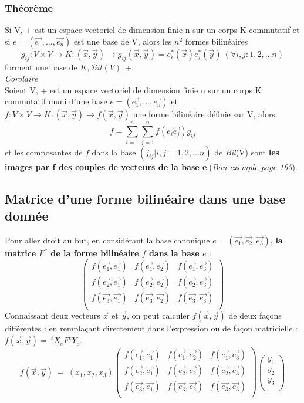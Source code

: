 \documentclass[12pt, a4paper, openany]{article}
\begin{document}
\subsubsection*{Théorème}
Si V, + est un espace vectoriel de dimension finie n sur un corps K commutatif et si $e = (\vec{e_1}, ..., \vec{e_n})$ est une base de V, alors les $n^2$ formes bilinéaires 
$$g_{ij} : V \times V \rightarrow K : (\vec{x}, \vec{y}) \rightarrow g_{ij}(\vec{x}, \vec{y}) = e_i^*(\vec{x})e_j^*(\vec{y})\ (\forall i, j : 1,2,...n)$$
forment une base de $K,\mathcal{B}il(V),+$.\\

\emph{Corolaire}\\
Soient V, + est un espace vectoriel de dimension finie n sur un corps K commutatif muni d'une base $e = (\vec{e_1}, ..., \vec{e_n})$ et $f : V \times V \rightarrow K : (\vec{x}, \vec{y}) \rightarrow f(\vec{x}, \vec{y})$ une forme bilinéaire définie sur V, alors
$$f = \sum_{i=1}^n\sum_{j=1}^n f(\vec{e_i}\vec{e_j})g_{ij}$$
et les composantes de $f$ dans la base $(j_{ij} | i,j= 1,2,...n)$ de \textit{Bil}(V) sont \textbf{les images par f des couples de vecteurs de la base e}.(\textit{Bon exemple page 165}).

\subsection{Matrice d'une forme bilinéaire dans une base donnée}
Pour aller droit au but, en considérant la base canonique $e = (\vec{e_1}, \vec{e_2}, \vec{e_3})$, \textbf{la matrice $F^e$ de la forme bilinéaire $f$ dans la base $e$} :
$$\begin{pmatrix}
f(\vec{e_1}, \vec{e_1}) & f(\vec{e_1}, \vec{e_2}) & f(\vec{e_1}, \vec{e_3})\\
f(\vec{e_2}, \vec{e_1}) & f(\vec{e_2}, \vec{e_2}) & f(\vec{e_2}, \vec{e_3})\\
f(\vec{e_3}, \vec{e_1}) & f(\vec{e_3}, \vec{e_2}) & f(\vec{e_3}, \vec{e_3})\\
\end{pmatrix}$$
Connaissant deux vecteurs $\vec{x}$ et $\vec{y}$, on peut calculer $f(\vec{x}, \vec{y})$ de deux façons différentes : en remplaçant directement dans l'expression ou de façon matricielle :$f(\vec{x}, \vec{y}) =\ ^tX_e F^e Y_e$.
$$f(\vec{x}, \vec{y})\ =\ \left(x_1, x_2, x_3\right)\begin{pmatrix}
f(\vec{e_1}, \vec{e_1}) & f(\vec{e_1}, \vec{e_2}) & f(\vec{e_1}, \vec{e_3})\\
f(\vec{e_2}, \vec{e_1}) & f(\vec{e_2}, \vec{e_2}) & f(\vec{e_2}, \vec{e_3})\\
f(\vec{e_3}, \vec{e_1}) & f(\vec{e_3}, \vec{e_2}) & f(\vec{e_3}, \vec{e_3})\\
\end{pmatrix}\begin{pmatrix}
y_1\\
y_2\\
y_3\\
\end{pmatrix}$$
\end{document}
